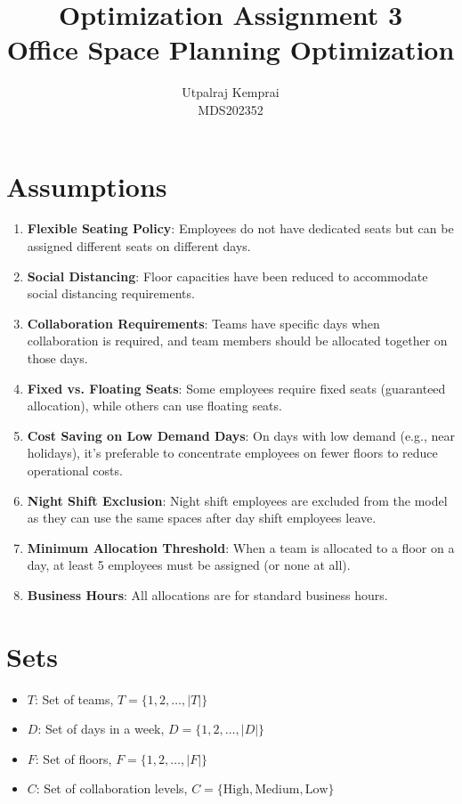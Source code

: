 \documentclass[12pt]{article}
\begin{document}
\title{Optimization Assignment 3 \\
Office Space Planning Optimization}
\author{Utpalraj Kemprai\\MDS202352}
\date{}
\maketitle

\section{Assumptions}

\begin{enumerate}
\item \textbf{Flexible Seating Policy}: Employees do not have dedicated seats but can be assigned different seats on different days.

\item \textbf{Social Distancing}: Floor capacities have been reduced to accommodate social distancing requirements.

\item \textbf{Collaboration Requirements}: Teams have specific days when collaboration is required, and team members should be allocated together on those days.

\item \textbf{Fixed vs. Floating Seats}: Some employees require fixed seats (guaranteed allocation), while others can use floating seats.

\item \textbf{Cost Saving on Low Demand Days}: On days with low demand (e.g., near holidays), it's preferable to concentrate employees on fewer floors to reduce operational costs.

\item \textbf{Night Shift Exclusion}: Night shift employees are excluded from the model as they can use the same spaces after day shift employees leave.

\item \textbf{Minimum Allocation Threshold}: When a team is allocated to a floor on a day, at least 5 employees must be assigned (or none at all).

\item \textbf{Business Hours}: All allocations are for standard business hours.
\end{enumerate}

\section{Sets}
\begin{itemize}
\item $T$: Set of teams, $T = \{1, 2, \ldots, |T|\}$
\item $D$: Set of days in a week, $D = \{1, 2, \ldots, |D|\}$
\item $F$: Set of floors, $F = \{1, 2, \ldots, |F|\}$
\item $C$: Set of collaboration levels, $C = \{\text{High}, \text{Medium}, \text{Low}\}$
\end{itemize}
\end{document}
